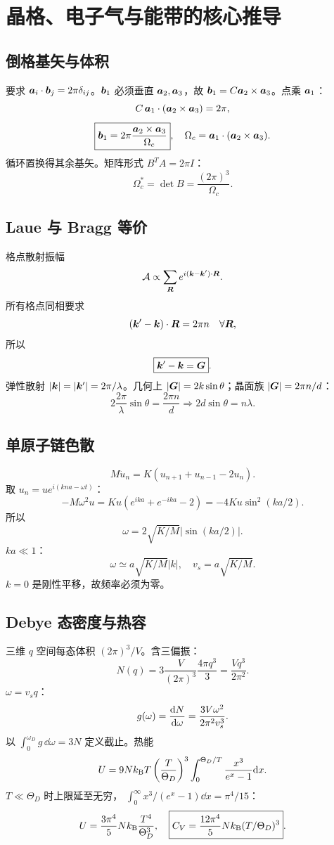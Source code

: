 \chapter{晶格、电子气与能带的核心推导}

\section{倒格基矢与体积}
要求
$\bm{a}_i\cdot\bm{b}_j=2\pi\delta_{ij}$。$\bm{b}_1$ 必须垂直
$\bm{a}_2,\bm{a}_3$，故
$\bm{b}_1=C\bm{a}_2\times\bm{a}_3$。点乘 $\bm{a}_1$：
\[
C\,\bm{a}_1\cdot(\bm{a}_2\times\bm{a}_3)=2\pi,
\]
\[
\boxed{\bm{b}_1=2\pi
\frac{\bm{a}_2\times\bm{a}_3}{\Omega_c}},
\quad
\Omega_c=\bm{a}_1\cdot(\bm{a}_2\times\bm{a}_3).
\]
循环置换得其余基矢。矩阵形式 $B^TA=2\pi I$：
\[
\boxed{\Omega_c^*=\det B=\frac{(2\pi)^3}{\Omega_c}}.
\]

\section{Laue 与 Bragg 等价}
格点散射振幅
\[
\mathcal A\propto\sum_{\bm{R}}
e^{i(\bm{k}-\bm{k}')\cdot\bm{R}}.
\]
所有格点同相要求
\[
(\bm{k}'-\bm{k})\cdot\bm{R}=2\pi n
\quad\forall\bm{R},
\]
所以
\[
\boxed{\bm{k}'-\bm{k}=\bm{G}}.
\]
弹性散射 $|\bm{k}|=|\bm{k}'|=2\pi/\lambda$。几何上
$|\bm{G}|=2k\sin\theta$；晶面族
$|\bm{G}|=2\pi n/d$：
\[
2\frac{2\pi}{\lambda}\sin\theta=\frac{2\pi n}{d}
\Rightarrow\boxed{2d\sin\theta=n\lambda}.
\]

\section{单原子链色散}
\[
M\ddot u_n=K(u_{n+1}+u_{n-1}-2u_n).
\]
取
$u_n=u e^{i(kna-\omega t)}$：
\[
-M\omega^2u
=Ku(e^{ika}+e^{-ika}-2)
=-4Ku\sin^2(ka/2).
\]
所以
\[
\boxed{\omega=2\sqrt{K/M}|\sin(ka/2)|}.
\]
$ka\ll1$：
\[
\omega\simeq a\sqrt{K/M}|k|,\quad
v_s=a\sqrt{K/M}.
\]
$k=0$ 是刚性平移，故频率必须为零。

\section{Debye 态密度与热容}
三维 $q$ 空间每态体积 $(2\pi)^3/V$。含三偏振：
\[
N(q)=3\frac{V}{(2\pi)^3}\frac{4\pi q^3}{3}
=\frac{Vq^3}{2\pi^2}.
\]
$\omega=v_sq$：
\[
g(\omega)=\frac{\mathrm d N}{\mathrm d \omega}
=\frac{3V\omega^2}{2\pi^2v_s^3}.
\]
以 $\int_0^{\omega_D}g\,\dd\omega=3N$ 定义截止。热能
\[
U=9Nk_{\mathrm B} T\left(\frac T{\Theta_D}\right)^3
\int_0^{\Theta_D/T}\frac{x^3}{e^x-1}\mathrm d x.
\]
$T\ll\Theta_D$ 时上限延至无穷，
$\int_0^\infty x^3/(e^x-1)\dd x=\pi^4/15$：
\[
U=\frac{3\pi^4}{5}Nk_{\mathrm B}\frac{T^4}{\Theta_D^3},
\quad
\boxed{C_V=\frac{12\pi^4}{5}Nk_{\mathrm B}(T/\Theta_D)^3}.
\]

